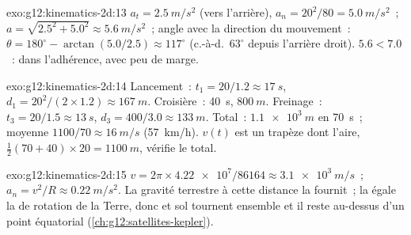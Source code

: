 \begin{solution}{exo:g12:kinematics-2d:13}
$a_t = \qty{2.5}{m/s^2}$ (vers l'arrière), $a_n = 20^2/80 =
\qty{5.0}{m/s^2}$~;
$a = \sqrt{2.5^2 + 5.0^2} \approx \qty{5.6}{m/s^2}$~; angle avec la
direction du mouvement~: $\theta = 180^\circ - \arctan(5.0/2.5) \approx 117^\circ$
(c.-à-d.\ $63^\circ$ depuis l'arrière droit). $5.6 < 7.0$~: dans
l'adhérence, avec peu de marge.
\end{solution}

\begin{solution}{exo:g12:kinematics-2d:14}
Lancement~: $t_1 = 20/1.2 \approx \qty{17}{s}$,
$d_1 = 20^2/(2 \times 1.2) \approx \qty{167}{m}$. Croisière~:
\qty{40}{s}, $\qty{800}{m}$. Freinage~: $t_3 = 20/1.5 \approx
\qty{13}{s}$, $d_3 = 400/3.0 \approx \qty{133}{m}$. Total~:
$\qty{1.1e3}{m}$ en \qty{70}{s}~; moyenne $1100/70 \approx
\qty{16}{m/s}$ (\qty{57}{km/h}). $v(t)$ est un trapèze dont l'aire,
$\tfrac12(70 + 40) \times 20 = \qty{1100}{m}$, vérifie le total.
\end{solution}

\begin{solution}{exo:g12:kinematics-2d:15}
$v = 2\pi \times \num{4.22e7}/\num{86164} \approx \qty{3.1e3}{m/s}$~;
$a_n = v^2/R \approx \qty{0.22}{m/s^2}$. La gravité terrestre à cette
distance la fournit~; la  égale la
 de rotation de la Terre, donc
 et sol tournent ensemble et il reste au-dessus
d'un point équatorial (\cref{ch:g12:satellites-kepler}).
\end{solution}

